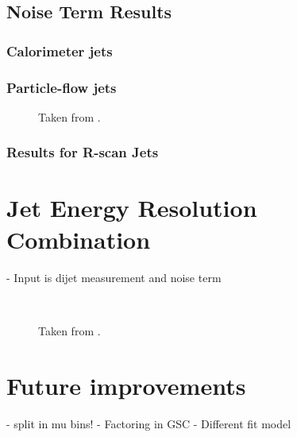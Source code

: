 \subsection{Noise Term Results}
\subsubsection{Calorimeter jets}
\subsubsection{Particle-flow jets}

\begin{figure}
    \caption{Taken from .}
    \label{fig:noise-term-results-pflow}
\end{figure}



\subsubsection{Results for R-scan Jets}


\section{Jet Energy Resolution Combination}

- Input is dijet measurement and noise term

\begin{figure}
     \\
    \caption{Taken from .}
    \label{fig:jer-combination-results}
\end{figure}



\section{Future improvements}

- split in mu bins!
- Factoring in GSC
- Different fit model
